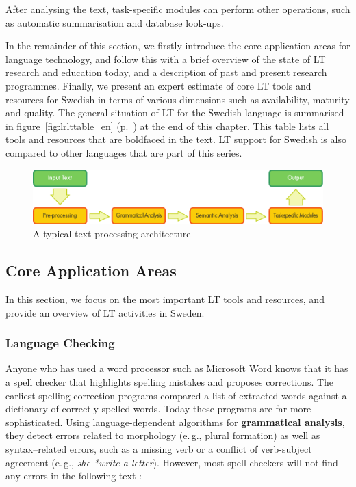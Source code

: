 \begin{multicols}{2}
After analysing the text, task-specific modules can perform other operations, such as automatic summarisation and database look-ups.

In the remainder of this section, we firstly introduce the core application areas for language technology, and follow this with a brief overview of the state of LT research and education today, and a description of past and present research programmes. Finally, we present an expert estimate of core LT tools and resources for Swedish in terms of various dimensions such as availability, maturity and quality. The general situation of LT for the Swedish language is summarised in figure~\ref{fig:lrlttable_en} (p.~\pageref{fig:lrlttable_en}) at the end of this chapter. This table lists all tools and resources that are boldfaced in the text. LT support for Swedish is also compared to other languages that are part of this series.


\begin{figure}[htb]
  \center
  \includegraphics[width=\textwidth]{../_media/english/text_processing_app_architecture}
  \caption{A typical text processing architecture}
  \label{fig:textprocessingarch_en}
\end{figure}

\subsection{Core Application Areas}

In this section, we focus on the most important LT tools and resources, and provide an overview of LT activities in Sweden. 

\subsubsection{Language Checking}

Anyone who has used a word processor such as Microsoft Word knows that
it has a spell checker that highlights spelling mistakes and proposes
corrections. The earliest spelling correction programs compared a list
of extracted words against a dictionary of correctly spelled
words. Today these programs are far more sophisticated. Using
language-dependent algorithms for \textbf{grammatical analysis}, they
detect errors related to morphology (e.\,g., plural formation) as well
as syntax–related errors, such as a missing verb or a conflict of
verb-subject agreement (e.\,g., \textit{she *write a
  letter}). However, most spell checkers will not find any errors in
the following text \cite{zar1}:


\end{multicols}
